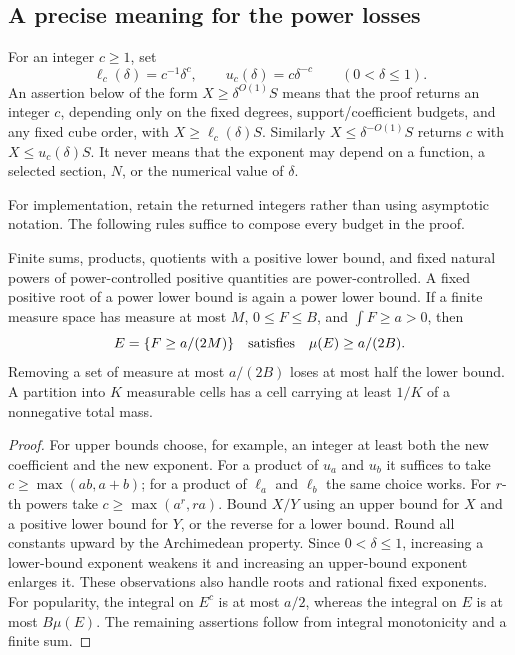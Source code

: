 \documentclass[11pt]{article}
\theoremstyle{definition}
\begin{document}
\subsection{A precise meaning for the power losses}
For an integer $c\geq1$, set
\[
 \ell_c(\delta)=c^{-1}\delta^c,\qquad u_c(\delta)=c\delta^{-c}
 \qquad(0<\delta\leq1).
\]
An assertion below of the form $X\geq\delta^{O(1)}S$ means that the proof returns an integer
$c$, depending only on the fixed degrees, support/coefficient budgets, and any fixed cube order,
with $X\geq\ell_c(\delta)S$.  Similarly $X\leq\delta^{-O(1)}S$ returns $c$ with
$X\leq u_c(\delta)S$.  It never means that the exponent may depend on a function, a selected
section, $N$, or the numerical value of $\delta$.

For implementation, retain the returned integers rather than using asymptotic notation.
The following rules suffice to compose every budget in the proof.
\begin{lemma}\label{patch:budgets}
Finite sums, products, quotients with a positive lower bound, and fixed natural powers of
power-controlled positive quantities are power-controlled.  A fixed positive root of a
power lower bound is again a power lower bound.  If a finite measure space has measure at most
$M$, $0\leq F\leq B$, and $\int F\geq a>0$, then
\[
 E=\{F\geq a/(2M)\}\quad\hbox{satisfies}\quad \mu(E)\geq a/(2B).
\]
Removing a set of measure at most $a/(2B)$ loses at most half the lower bound.  A partition
into $K$ measurable cells has a cell carrying at least $1/K$ of a nonnegative total mass.
\end{lemma}
\begin{proof}
For upper bounds choose, for example, an integer at least both the new coefficient and the
new exponent.  For a product of $u_a$ and $u_b$ it suffices to take
$c\geq\max(ab,a+b)$; for a product of $\ell_a$ and $\ell_b$ the same choice works.
For $r$-th powers take $c\geq\max(a^r,ra)$.  Bound $X/Y$ using an upper bound for $X$
and a positive lower bound for $Y$, or the reverse for a lower bound.  Round all constants
upward by the Archimedean property.  Since $0<\delta\leq1$, increasing a lower-bound exponent
weakens it and increasing an upper-bound exponent enlarges it.  These observations also
handle roots and rational fixed exponents.
For popularity, the integral on $E^c$ is at most $a/2$, whereas the integral on $E$ is at most
$B\mu(E)$.  The remaining assertions follow from integral monotonicity and a finite sum.
\end{proof}
\end{document}

